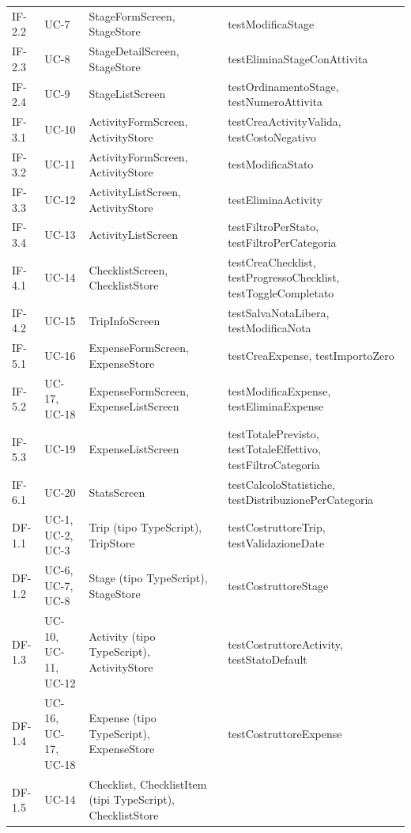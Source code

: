 \documentclass[12pt, a4paper]{article}
\begin{document}
\begin{longtable}{@{}L{1.8cm}L{3.5cm}L{3.5cm}L{5.2cm}@{}}
  IF-2.2 & UC-7 & StageFormScreen, StageStore &
    testModificaStage \\
  IF-2.3 & UC-8 & StageDetailScreen, StageStore &
    testEliminaStageConAttivita \\
  IF-2.4 & UC-9 & StageListScreen &
    testOrdinamentoStage, testNumeroAttivita \\
  IF-3.1 & UC-10 & ActivityFormScreen, ActivityStore &
    testCreaActivityValida, testCostoNegativo \\
  IF-3.2 & UC-11 & ActivityFormScreen, ActivityStore &
    testModificaStato \\
  IF-3.3 & UC-12 & ActivityListScreen, ActivityStore &
    testEliminaActivity \\
  IF-3.4 & UC-13 & ActivityListScreen &
    testFiltroPerStato, testFiltroPerCategoria \\
  IF-4.1 & UC-14 & ChecklistScreen, ChecklistStore &
    testCreaChecklist, testProgressoChecklist, testToggleCompletato \\
  IF-4.2 & UC-15 & TripInfoScreen &
    testSalvaNotaLibera, testModificaNota \\
  IF-5.1 & UC-16 & ExpenseFormScreen, ExpenseStore &
    testCreaExpense, testImportoZero \\
  IF-5.2 & UC-17, UC-18 & ExpenseFormScreen, ExpenseListScreen &
    testModificaExpense, testEliminaExpense \\
  IF-5.3 & UC-19 & ExpenseListScreen &
    testTotalePrevisto, testTotaleEffettivo, testFiltroCategoria \\
  IF-6.1 & UC-20 & StatsScreen &
    testCalcoloStatistiche, testDistribuzionePerCategoria \\
  \midrule
  DF-1.1 & UC-1, UC-2, UC-3 & Trip (tipo TypeScript), TripStore &
    testCostruttoreTrip, testValidazioneDate \\
  DF-1.2 & UC-6, UC-7, UC-8 & Stage (tipo TypeScript), StageStore &
    testCostruttoreStage \\
  DF-1.3 & UC-10, UC-11, UC-12 & Activity (tipo TypeScript), ActivityStore &
    testCostruttoreActivity, testStatoDefault \\
  DF-1.4 & UC-16, UC-17, UC-18 & Expense (tipo TypeScript), ExpenseStore &
    testCostruttoreExpense \\
  DF-1.5 & UC-14 & Checklist, ChecklistItem (tipi TypeScript), ChecklistStore &

\end{longtable}
\end{document}
